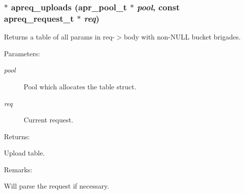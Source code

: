 \subsubsection{$\ast$ apreq\_\-uploads ({\bf apr\_\-pool\_\-t} $\ast$ {\em pool}, const {\bf apreq\_\-request\_\-t} $\ast$ {\em req})}\label{group__params_a14}


Returns a table of all params in req-$>$body with non-NULL bucket brigades. \begin{Desc}
\item[Parameters: ]\par
\begin{description}
\item[{\em 
pool}]Pool which allocates the table struct. \item[{\em 
req}]Current request. \end{description}
\end{Desc}
\begin{Desc}
\item[Returns: ]\par
Upload table. \end{Desc}
\begin{Desc}
\item[Remarks: ]\par
Will parse the request if necessary. \end{Desc}
